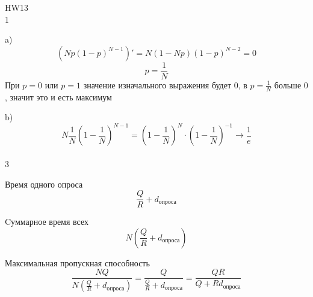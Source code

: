 \documentclass[a4paper,11pt]{article}
\begin{document}
\Large
HW13
\\
1

a) $$(Np(1 - p)^{N - 1})' = N (1 - Np) (1 - p)^{N - 2} = 0$$
$$p = \frac{1}{N}$$
При $p = 0$ или $p = 1$ значение изначального выражения будет $0$, в $p = \frac{1}{N}$ больше $0$, значит это и есть максимум

b) $$N \frac{1}{N} (1 - \frac{1}{N})^{N - 1} = (1 - \frac{1}{N})^N \cdot (1 - \frac{1}{N})^{-1} \to \frac{1}{e}$$
\\
3

Время одного опроса 
$$\frac{Q}{R} + d_{\text{опроса}}$$

Cуммарное время всех 
$$N(\frac{Q}{R} + d_{\text{опроса}})$$

Максимальная пропускная способность 
$$\frac{NQ}{N(\frac{Q}{R} + d_{\text{опроса}})} = \frac{Q}{\frac{Q}{R} + d_{\text{опроса}}} = \frac{QR}{Q + R d_{\text{опроса}}}$$
\end{document}
